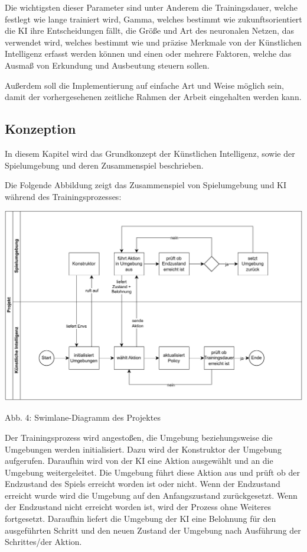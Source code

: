 Die wichtigsten dieser Parameter sind unter Anderem die Trainingsdauer, welche festlegt wie lange trainiert wird, Gamma, welches bestimmt wie zukunftsorientiert die KI ihre Entscheidungen fällt, die Größe und Art des neuronalen Netzen, das verwendet wird, welches bestimmt wie und präzise Merkmale von der Künstlichen Intelligenz erfasst werden können und einen oder mehrere Faktoren, welche das Ausmaß von Erkundung und Ausbeutung steuern sollen. 

Außerdem soll die Implementierung auf einfache Art und Weise möglich sein, damit der vorhergesehenen zeitliche Rahmen der Arbeit eingehalten werden kann.
\subsection{Konzeption}
In diesem Kapitel wird das Grundkonzept der Künstlichen Intelligenz, sowie der Spielumgebung und deren Zusammenspiel beschrieben.

\begin{minipage}{\linewidth}
	Die Folgende Abbildung zeigt das Zusammenspiel von Spielumgebung und KI während des Trainingsprozesses:
	
	\vspace{0.5cm}
	\includegraphics[width=1\textwidth]{Bilder/swimlane.drawio.pdf} 
	
	Abb. 4: Swimlane-Diagramm des Projektes \\

\end{minipage}

Der Trainingsprozess wird angestoßen, die Umgebung beziehungsweise die Umgebungen werden initialisiert. Dazu wird der Konstruktor der Umgebung aufgerufen. Daraufhin wird von der KI eine Aktion ausgewählt und an die Umgebung weitergeleitet. Die Umgebung führt diese Aktion aus und prüft ob der Endzustand des Spiels erreicht worden ist oder nicht. Wenn der Endzustand erreicht wurde wird die Umgebung auf den Anfangszustand zurückgesetzt. Wenn der Endzustand nicht erreicht worden ist, wird der Prozess ohne Weiteres fortgesetzt. Daraufhin liefert die Umgebung der KI eine Belohnung für den ausgeführten Schritt und den neuen Zustand der Umgebung nach Ausführung der Schrittes/der Aktion.

